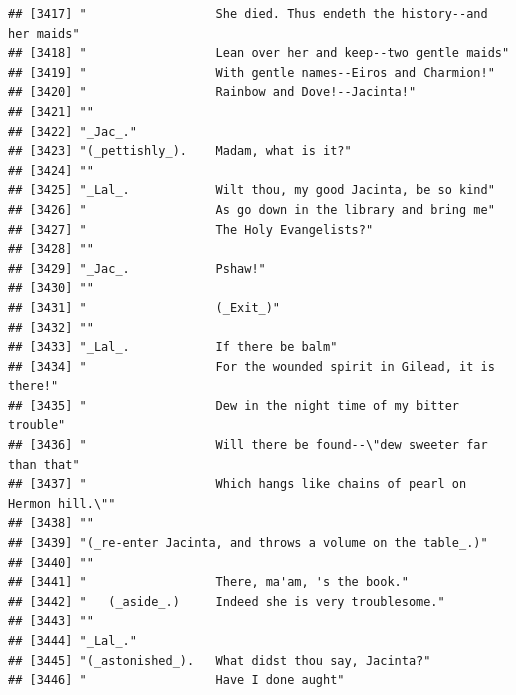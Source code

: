\documentclass{article}\usepackage[]{graphicx}\usepackage[]{color}
\makeatletter
\newenvironment{kframe}{%
 \def\at@end@of@kframe{}%
 \ifinner\ifhmode%
  \def\at@end@of@kframe{\end{minipage}}%
  \begin{minipage}{\columnwidth}%
 \fi\fi%
 \def\FrameCommand##1{\hskip\@totalleftmargin \hskip-\fboxsep
 \colorbox{shadecolor}{##1}\hskip-\fboxsep
     \hskip-\linewidth \hskip-\@totalleftmargin \hskip\columnwidth}%
 \MakeFramed {\advance\hsize-\width
   \@totalleftmargin\z@ \linewidth\hsize
   \@setminipage}}%
 {\par\unskip\endMakeFramed%
 \at@end@of@kframe}
\newenvironment{knitrout}{}{} %
\makeatother
\begin{document}
\begin{knitrout}
\begin{kframe}
\begin{verbatim}
## [3417] "                  She died. Thus endeth the history--and her maids"          
## [3418] "                  Lean over her and keep--two gentle maids"                  
## [3419] "                  With gentle names--Eiros and Charmion!"                    
## [3420] "                  Rainbow and Dove!--Jacinta!"                               
## [3421] ""                                                                            
## [3422] "_Jac_."                                                                      
## [3423] "(_pettishly_).    Madam, what is it?"                                        
## [3424] ""                                                                            
## [3425] "_Lal_.            Wilt thou, my good Jacinta, be so kind"                    
## [3426] "                  As go down in the library and bring me"                    
## [3427] "                  The Holy Evangelists?"                                     
## [3428] ""                                                                            
## [3429] "_Jac_.            Pshaw!"                                                    
## [3430] ""                                                                            
## [3431] "                  (_Exit_)"                                                  
## [3432] ""                                                                            
## [3433] "_Lal_.            If there be balm"                                          
## [3434] "                  For the wounded spirit in Gilead, it is there!"            
## [3435] "                  Dew in the night time of my bitter trouble"                
## [3436] "                  Will there be found--\"dew sweeter far than that"          
## [3437] "                  Which hangs like chains of pearl on Hermon hill.\""        
## [3438] ""                                                                            
## [3439] "(_re-enter Jacinta, and throws a volume on the table_.)"                     
## [3440] ""                                                                            
## [3441] "                  There, ma'am, 's the book."                                
## [3442] "   (_aside_.)     Indeed she is very troublesome."                           
## [3443] ""                                                                            
## [3444] "_Lal_."                                                                      
## [3445] "(_astonished_).   What didst thou say, Jacinta?"                             
## [3446] "                  Have I done aught"                                         

\end{verbatim}
\end{kframe}
\end{knitrout}
\end{document}
